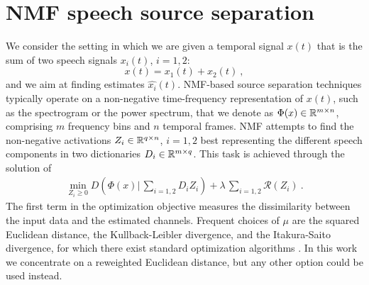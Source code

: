 \section{NMF speech source separation}
\label{nmfsec}

%
We consider the setting in which we are given a temporal signal $x(t)$ that is the sum of  
two speech signals $x_i(t)$, $i=1,2$:
\begin{equation}
\label{ssep}
x(t) = x_1(t) + x_2(t)~,
\end{equation}
and we aim at finding estimates $\widehat{x_i}(t)$.
NMF-based source separation 
techniques typically operate on a non-negative time-frequency representation of $x(t)$, 
such as the spectrogram or the power spectrum,
that we denote as $\Phi(x) \in \mathbb{R}^{m \times n}$, comprising $m$ frequency bins and $n$ temporal frames. 
NMF attempts to find the non-negative activations $Z_i \in \mathbb{R}^{q \times n}$, $i=1,2$ 
best representing the different speech components in two dictionaries ${D}_{i} \in \mathbb{R}^{m \times q}$.
%
This task is achieved through the solution of %
\begin{eqnarray}
\label{eq:optim_general}
\min_{ Z_i \ge 0 } D( \Phi(x) |  \, \sum_{i=1,2} {D}_i Z_i  ) + 
\lambda\, \sum_{i=1,2} \mathcal{R}(Z_i)~.
\end{eqnarray}
The first term in the optimization objective measures the dissimilarity between the input data and the estimated channels. 
Frequent choices of $\mu$ are the squared Euclidean distance,
the Kullback-Leibler divergence, and the Itakura-Saito divergence, for which there exist standard optimization algorithms \cite{fevotte2011algorithms}.
In this work we concentrate on a reweighted Euclidean distance, but any other option could be used instead.
%
